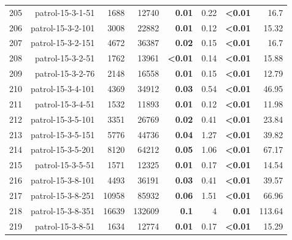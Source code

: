 \begin{longtable}{lrr@{\hskip 12pt}r@{\hskip 12pt}r@{\hskip 12pt}r@{\hskip 12pt}r@{\hskip 12pt}r}
205 & \multirow{1}{*}{patrol-15-3-1-51} & \multirow{1}{*}{1688} & \multirow{1}{*}{12740} & \textbf{0.01} & 0.22 & \textbf{<0.01} & 16.7 \\
206 & \multirow{1}{*}{patrol-15-3-2-101} & \multirow{1}{*}{3008} & \multirow{1}{*}{22882} & \textbf{0.01} & 0.12 & \textbf{<0.01} & 15.32 \\
207 & \multirow{1}{*}{patrol-15-3-2-151} & \multirow{1}{*}{4672} & \multirow{1}{*}{36387} & \textbf{0.02} & 0.15 & \textbf{<0.01} & 16.7 \\
208 & \multirow{1}{*}{patrol-15-3-2-51} & \multirow{1}{*}{1762} & \multirow{1}{*}{13961} & \textbf{<0.01} & 0.14 & \textbf{<0.01} & 15.88 \\
209 & \multirow{1}{*}{patrol-15-3-2-76} & \multirow{1}{*}{2148} & \multirow{1}{*}{16558} & \textbf{0.01} & 0.15 & \textbf{<0.01} & 12.79 \\
210 & \multirow{1}{*}{patrol-15-3-4-101} & \multirow{1}{*}{4369} & \multirow{1}{*}{34912} & \textbf{0.03} & 0.54 & \textbf{<0.01} & 46.95 \\
211 & \multirow{1}{*}{patrol-15-3-4-51} & \multirow{1}{*}{1532} & \multirow{1}{*}{11893} & \textbf{0.01} & 0.12 & \textbf{<0.01} & 11.98 \\
212 & \multirow{1}{*}{patrol-15-3-5-101} & \multirow{1}{*}{3351} & \multirow{1}{*}{26769} & \textbf{0.02} & 0.41 & \textbf{<0.01} & 23.84 \\
213 & \multirow{1}{*}{patrol-15-3-5-151} & \multirow{1}{*}{5776} & \multirow{1}{*}{44736} & \textbf{0.04} & 1.27 & \textbf{<0.01} & 39.82 \\
214 & \multirow{1}{*}{patrol-15-3-5-201} & \multirow{1}{*}{8120} & \multirow{1}{*}{64212} & \textbf{0.05} & 1.06 & \textbf{<0.01} & 67.17 \\
215 & \multirow{1}{*}{patrol-15-3-5-51} & \multirow{1}{*}{1571} & \multirow{1}{*}{12325} & \textbf{0.01} & 0.17 & \textbf{<0.01} & 14.54 \\
216 & \multirow{1}{*}{patrol-15-3-8-101} & \multirow{1}{*}{4493} & \multirow{1}{*}{36191} & \textbf{0.03} & 0.41 & \textbf{<0.01} & 39.57 \\
217 & \multirow{1}{*}{patrol-15-3-8-251} & \multirow{1}{*}{10958} & \multirow{1}{*}{85932} & \textbf{0.06} & 1.51 & \textbf{<0.01} & 66.96 \\
218 & \multirow{1}{*}{patrol-15-3-8-351} & \multirow{1}{*}{16639} & \multirow{1}{*}{132609} & \textbf{0.1} & 4 & \textbf{0.01} & 113.64 \\
219 & \multirow{1}{*}{patrol-15-3-8-51} & \multirow{1}{*}{1634} & \multirow{1}{*}{12774} & \textbf{0.01} & 0.17 & \textbf{<0.01} & 15.29 \\

\end{longtable}
